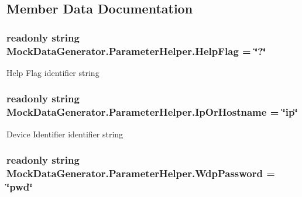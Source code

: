 \subsection{Member Data Documentation}
\subsubsection[{\texorpdfstring{Help\+Flag}{HelpFlag}}]{\setlength{\rightskip}{0pt plus 5cm}readonly string Mock\+Data\+Generator.\+Parameter\+Helper.\+Help\+Flag = \char`\"{}?\char`\"{}\hspace{0.3cm}{\ttfamily [static]}}\hypertarget{class_mock_data_generator_1_1_parameter_helper_abf714b4e3c94b56cbd994db316c92d23}{}\label{class_mock_data_generator_1_1_parameter_helper_abf714b4e3c94b56cbd994db316c92d23}


Help Flag identifier string 

\subsubsection[{\texorpdfstring{Ip\+Or\+Hostname}{IpOrHostname}}]{\setlength{\rightskip}{0pt plus 5cm}readonly string Mock\+Data\+Generator.\+Parameter\+Helper.\+Ip\+Or\+Hostname = \char`\"{}ip\char`\"{}\hspace{0.3cm}{\ttfamily [static]}}\hypertarget{class_mock_data_generator_1_1_parameter_helper_a6258a253b06b4aef1a678372f6c035fa}{}\label{class_mock_data_generator_1_1_parameter_helper_a6258a253b06b4aef1a678372f6c035fa}


Device Identifier identifier string 

\subsubsection[{\texorpdfstring{Wdp\+Password}{WdpPassword}}]{\setlength{\rightskip}{0pt plus 5cm}readonly string Mock\+Data\+Generator.\+Parameter\+Helper.\+Wdp\+Password = \char`\"{}pwd\char`\"{}\hspace{0.3cm}{\ttfamily [static]}}\hypertarget{class_mock_data_generator_1_1_parameter_helper_ac751eeb8296390769e03caa6c44e3dba}{}\label{class_mock_data_generator_1_1_parameter_helper_ac751eeb8296390769e03caa6c44e3dba}


